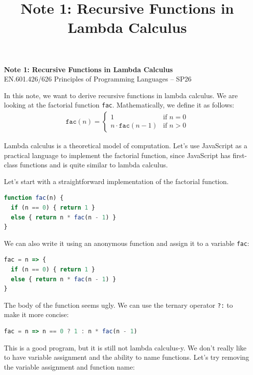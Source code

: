 \documentclass[12pt]{article}
\title{Note 1: Recursive Functions in Lambda Calculus}
\author{}
\date{}
\begin{document}
\noindent
\textbf{\Large Note 1: Recursive Functions in Lambda Calculus} \\[0.5em]
EN.601.426/626 Principles of Programming Languages -- SP26

\vspace{1em}

\vspace{1em}

In this note, we want to derive recursive functions in lambda calculus.
We are looking at the factorial function \texttt{fac}.
Mathematically, we define it as follows:
\begin{align*}
\texttt{fac}(n) = \begin{cases}
1 & \text{if } n = 0 \\
n \cdot \texttt{fac}(n - 1) & \text{if } n > 0
\end{cases}
\end{align*}

Lambda calculus is a theoretical model of computation.
Let's use JavaScript as a practical language to implement the factorial function, since JavaScript has first-class functions and is quite similar to lambda calculus.

Let's start with a straightforward implementation of the factorial function. 

\begin{lstlisting}[frame=single,language=javascript,basicstyle=\ttfamily]
function fac(n) {
  if (n == 0) { return 1 }
  else { return n * fac(n - 1) }
}
\end{lstlisting}

We can also write it using an anonymous function and assign it to a variable \texttt{fac}:

\begin{lstlisting}[frame=single,language=javascript,basicstyle=\ttfamily]
fac = n => {
  if (n == 0) { return 1 }
  else { return n * fac(n - 1) }
}
\end{lstlisting}

The body of the function seems ugly. 
We can use the ternary operator \texttt{?:} to make it more concise:

\begin{lstlisting}[frame=single,language=javascript,basicstyle=\ttfamily]
fac = n => n == 0 ? 1 : n * fac(n - 1)
\end{lstlisting}

This is a good program, but it is still not lambda calculus-y.
We don't really like to have variable assignment and the ability to name functions.
Let's try removing the variable assignment and function name:
\end{document}
